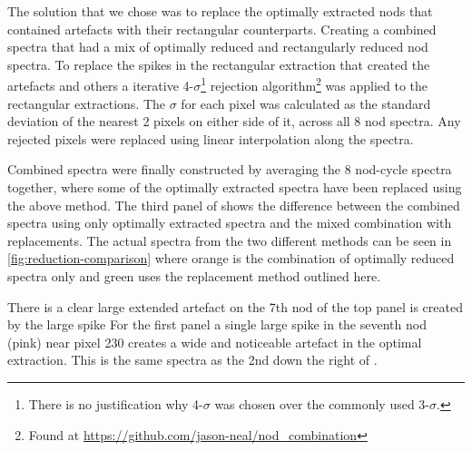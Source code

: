 The solution that we chose was to replace the optimally extracted nods that contained artefacts with their rectangular counterparts. Creating a combined spectra that had a mix of optimally reduced and rectangularly reduced nod spectra.
To replace the spikes in the rectangular extraction that created the artefacts and others a iterative 4-\(\sigma \)\footnote{There is no justification why 4-\(\sigma\) was chosen over the commonly used 3-\(\sigma\).} rejection algorithm\footnote{Found at \url{https://github.com/jason-neal/nod_combination}} was applied to the rectangular extractions. The \(\sigma\) for each pixel was calculated as the standard deviation of the nearest 2 pixels on either side of it, across all 8 nod spectra. Any rejected pixels were replaced using linear interpolation along the spectra.


Combined spectra were finally constructed by averaging the 8 nod-cycle spectra together, where some of the optimally extracted spectra have been replaced using the above method. The third panel of  shows the difference between the combined spectra using only optimally extracted spectra and the mixed combination with replacements. The actual spectra from the two different methods can be seen in \ref{fig:reduction-comparison} where orange is the combination of optimally reduced spectra only and green uses the replacement method outlined here.

There is a clear large extended artefact on the 7th nod of the top panel is created by the large spike For the first panel a single large spike in the seventh nod (pink) near pixel 230 creates a wide and noticeable artefact in the optimal extraction. This is the same spectra as the 2nd down the right of .



